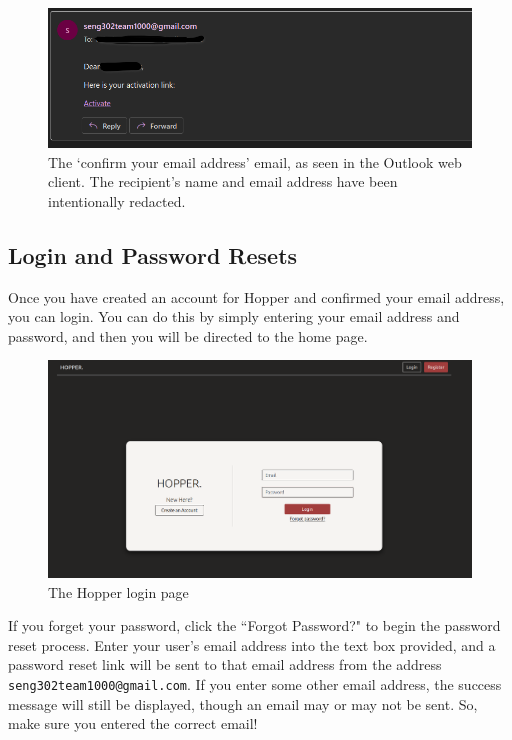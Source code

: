 \documentclass{article}
\begin{document}
    \begin{figure}
        \centering
        \includegraphics[width=\textwidth]{./confirm_email_address.png}
        \caption{The `confirm your email address' email, as seen in the Outlook web client. The recipient's name and email address have been intentionally redacted.}
        \label{fig:confirm_email}
    \end{figure}

    \subsection{Login and Password Resets}

    Once you have created an account for Hopper and confirmed your email address, you can login. You can do this by simply entering your email address and password, and then you will be directed to the home page.

    \begin{figure}
        \centering
        \includegraphics[width=\textwidth]{./login_page.png}
        \caption{The Hopper login page}
        \label{fig:login}
    \end{figure}

    If you forget your password, click the ``Forgot Password?" to begin the password reset process. Enter your user's email address into the text box provided, and a password reset link will be sent to that email address from the address \texttt{seng302team1000@gmail.com}. If you enter some other email address, the success message will still be displayed, though an email may or may not be sent. So, make sure you entered the correct email!
\end{document}
